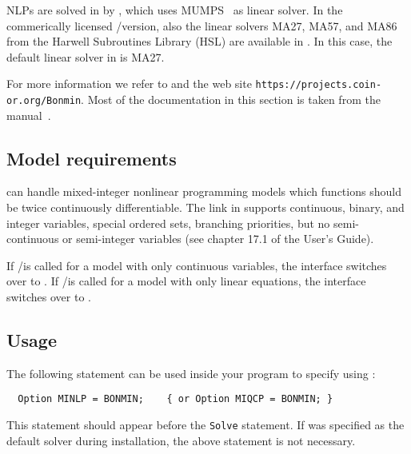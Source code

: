 NLPs are solved in \BONMIN by \IPOPT, which uses \textsc{MUMPS}~\cite{AmestoyDuffKosterLExcellent2001,AmestoyGuermoucheLExcellentPralet2006} as linear solver.
In the commerically licensed \GAMS/\BONMINH version, also the linear solvers \textsc{MA27}, \textsc{MA57}, and \textsc{MA86} from the Harwell Subroutines Library (HSL) are available in \IPOPT.
In this case, the default linear solver in \IPOPT is MA27.


For more information we refer to \cite{BoCoLoMa06,BoGo08,BoKiLi09,BBCCGLLLMSW} and the \BONMIN web site \texttt{https://projects.coin-or.org/Bonmin}.
Most of the \BONMIN documentation in this section is taken from the \BONMIN manual~\cite{BonminManual}.


\subsection{Model requirements}

\BONMIN can handle mixed-integer nonlinear programming models which functions should be twice continuously differentiable.
The \BONMIN link in \GAMS supports continuous, binary, and integer variables, special ordered sets, branching priorities, but no semi-continuous or semi-integer variables (see chapter 17.1 of the \GAMS User's Guide).

If \GAMS/\BONMIN is called for a model with only continuous variables, the interface switches over to \IPOPT.
If \GAMS/\BONMIN is called for a model with only linear equations, the interface switches over to \CBC.

\subsection{Usage}

The following statement can be used inside your \GAMS program to specify using \BONMIN:
\begin{verbatim}
  Option MINLP = BONMIN;    { or Option MIQCP = BONMIN; }
\end{verbatim}
This statement should appear before the \texttt{Solve} statement.
If \BONMIN was specified as the default solver during \GAMS installation, the above statement is not necessary.

